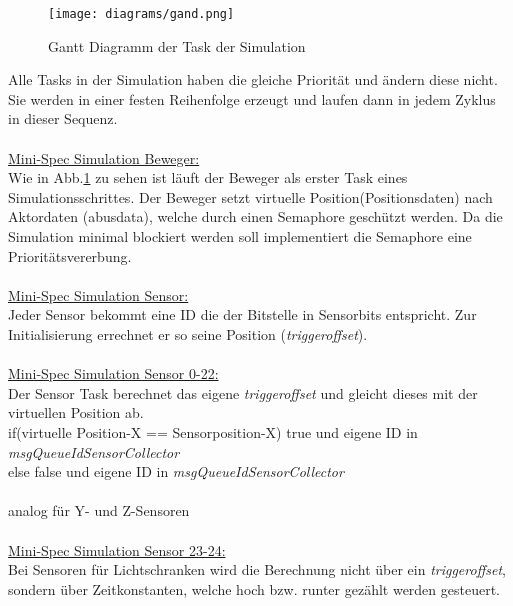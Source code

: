 \begin{figure}[H]
	\centering
  \texttt{[image: diagrams/gand.png]}
	\caption{Gantt Diagramm der Task der Simulation}
	\label{gantt}
\end{figure}

Alle Tasks in der Simulation haben die gleiche Priorität und ändern diese nicht. Sie werden in einer festen Reihenfolge erzeugt und laufen dann in jedem Zyklus in dieser Sequenz.\\
\\

\underline{Mini-Spec Simulation Beweger:}\\
Wie in Abb.\ref{gantt} zu sehen ist läuft der Beweger als erster Task eines Simulationsschrittes.
Der Beweger setzt virtuelle Position(Positionsdaten) nach Aktordaten (abusdata), welche durch einen Semaphore geschützt werden.  Da die Simulation minimal blockiert werden soll implementiert die Semaphore eine Prioritätsvererbung.\\ \\


\underline{Mini-Spec Simulation Sensor:}\\
Jeder Sensor bekommt eine ID die der Bitstelle in Sensorbits entspricht. Zur Initialisierung errechnet er so seine Position (\textit{triggeroffset}).\\ \\

\underline{Mini-Spec Simulation Sensor 0-22:}\\
Der Sensor Task berechnet das eigene \textit{triggeroffset} und gleicht dieses mit der virtuellen Position ab.\\
if(virtuelle Position-X == Sensorposition-X) true und eigene ID in \textit{msgQueueIdSensorCollector\\}
else false und eigene ID in \textit{msgQueueIdSensorCollector\\} \\
analog für Y- und Z-Sensoren\\ \\

\underline{Mini-Spec Simulation Sensor 23-24:}\\
Bei Sensoren für Lichtschranken wird die Berechnung nicht über ein \textit{triggeroffset}, sondern über Zeitkonstanten, welche hoch bzw. runter gezählt werden gesteuert.\\

